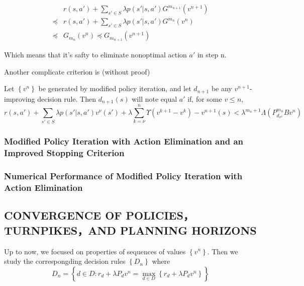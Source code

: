 \begin{align*}
    &r(s,a') + \sum^{}_{s' \in S} \lambda p(s' | s,a') G^{m_{n+1}}(v^{n+1}) \\
    \preceq& r(s,a') + \sum^{}_{s' \in S} \lambda p(s' | s,a') G^{m_{n}}(v^n) \\
    \preceq& G_{m_{n}}(v^n) \preceq G_{m_{n+1}}(v^{n+1})
\end{align*}

Which means that it's safty to eliminate nonoptimal action $ a' $ in step n.

Another complicate criterion is (without proof)
\begin{theorem}
    Let $ \left\{ v^n \right\} $ be generated by modified policy iteration, and let $ d_{n+1} $ be any $ v^{n+1} $-improving decision rule. Then $ d_{n+1}(s) $ will note equal $ a' $ if, for some $ v \le n $,
    \[
        r(s,a') + \sum^{}_{s' \in S}  \lambda p(s' | s, a') v^{\nu}(s') + \lambda \sum^{n}_{k = \nu} \Upsilon(v^{k+1} - v^{k}) - v^{n+1}(s) < \lambda^{m_n + 1} \Lambda(P^{m_n}_{d_{v^n}} B v^n)
    \]
\end{theorem}

\subsubsection{Modified Policy Iteration with Action Elimination and an Improved Stopping Criterion}%
\label{ssub:modified_policy_iteration_with_action_elimination_and_an_improved_stopping_criterion}

\subsubsection{Numerical Performance of Modified Policy Iteration with Action Elimination}%
\label{ssub:numerical_performance_of_modified_policy_iteration_with_action_elimination}

\subsection{CONVERGENCE OF POLICIES， TURNPIKES，AND PLANNING HORIZONS}%
\label{sub:convergence_of_policies_turnpikes_and_planning_horizons}

Up to now, we focused on properties of sequences of values $ \left\{ v^n \right\} $. Then we study the correspongding decision rules $ \left\{ D_n \right\} $ where
\[
    D_n = \left\{ d \in D: r_d + \lambda P_d v^n = \max_{d \in D} \left\{ r_d + \lambda P_d v^n \right\} \right\}
\]

